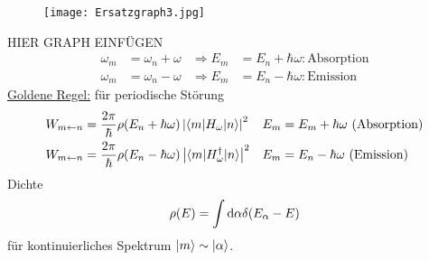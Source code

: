 		\begin{figure*} [tbp]
			\begin{center}
				\texttt{[image: Ersatzgraph3.jpg]}
			\end{center}
		\end{figure*}
	HIER GRAPH EINFÜGEN
	\FloatBarrier
		\begin{align*}
			\omega_m &= \omega_n + \omega &\Rightarrow E_m &= E_n + \hbar \omega: \text{Absorption} \\
			\omega_m &= \omega_n - \omega &\Rightarrow E_m &= E_n - \hbar \omega: \text{Emission}
		\end{align*}
		\underline{Goldene Regel:} für periodische Störung
		\begin{align*} 
		W_{m \leftarrow n} &= 
		\frac{2 \pi}{\hbar} \rho (E_n + \hbar \omega) \left|\braket{m | H_\omega | n}\right|^2 &
		E_m &= E_m + \hbar \omega \text{~(Absorption)} \\
		W_{m \leftarrow n} &= 
		\frac{2 \pi}{\hbar} \rho (E_n - \hbar \omega) \left| \braket{m | H_\omega^\dagger | n}\right|^2 &
		E_m &= E_n - \hbar \omega \text{~(Emission)}
		\end{align*} 
		Dichte
		\begin{align*}
		\rho (E) = \int \mathrm{d} \alpha \delta(E_\alpha - E)
		\end{align*}
		für kontinuierliches Spektrum $\ket{m} \sim \ket{\alpha}$.
		